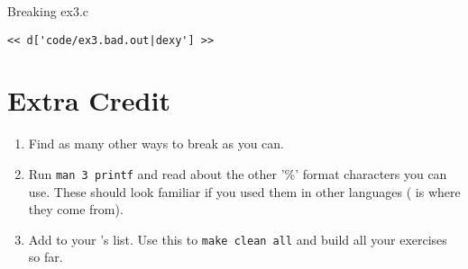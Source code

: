 \begin{Terminal}{Breaking ex3.c}
\begin{lstlisting}
<< d['code/ex3.bad.out|dexy'] >>
\end{lstlisting}
\end{Terminal}

\section{Extra Credit}

\begin{enumerate}
\item Find as many other ways to break  as you can.
\item Run \verb|man 3 printf| and read about the other '\%' format
    characters you can use.  These should look familiar if you used
    them in other languages ( is where they come from).
\item Add  to your 's  list.  Use this
    to \verb|make clean all| and build all your exercises so far.
\end{enumerate}


